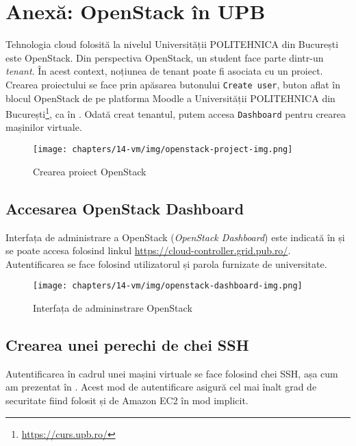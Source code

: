 \section{Anexă: OpenStack în UPB}
\label{sec:vm:upb-openstack}

Tehnologia cloud folosită la nivelul Universității POLITEHNICA din București este OpenStack.
Din perspectiva OpenStack, un student face parte dintr-un \textit{tenant}.
În acest context, noțiunea de tenant poate fi asociata cu un
proiect. Crearea proiectului se face prin apăsarea butonului \texttt{Create user}, buton
aflat în blocul OpenStack de pe platforma Moodle a Universității POLITEHNICA din București\footnote{\url{https://curs.upb.ro/}}, ca în . Odată
creat tenantul, putem accesa \texttt{Dashboard} pentru crearea mașinilor virtuale.

\begin{figure}[!htbp]
  \centering
  \texttt{[image: chapters/14-vm/img/openstack-project-img.png]}
  \caption{Crearea proiect OpenStack}
  \label{fig:vm:openstack-project}
\end{figure}

\subsection{Accesarea OpenStack Dashboard}
\label{sec:vm:upb-openstack:dashboard}

Interfața de administrare a OpenStack (\textit{OpenStack Dashboard}) este indicată în  și se poate accesa
folosind linkul \url{https://cloud-controller.grid.pub.ro/}. Autentificarea se face
folosind utilizatorul și parola furnizate de universitate.

\begin{figure}[!htbp]
  \centering
  \texttt{[image: chapters/14-vm/img/openstack-dashboard-img.png]}
  \caption{Interfața de admininstrare OpenStack}
  \label{fig:vm:openstack-dashboard}
\end{figure}

\subsection{Crearea unei perechi de chei SSH}
\label{sec:vm:upb-openstack:keys}

Autentificarea în cadrul unei mașini virtuale se face folosind chei SSH, așa cum am prezentat în . Acest mod de autentificare asigură cel mai înalt grad de securitate fiind folosit și de Amazon EC2 în mod implicit.

